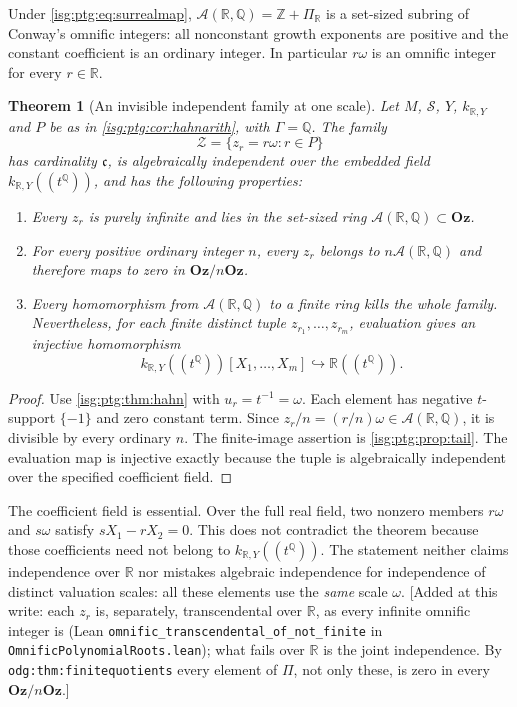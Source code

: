 \documentclass[11pt]{article}
\newtheorem{theorem}{Theorem}[section]
\theoremstyle{definition}
\theoremstyle{remark}
\newcommand{\Oz}{\ensuremath{\mathbf{Oz}}}
\newcommand{\R}{\mathbb{R}}
\newcommand{\Z}{\mathbb{Z}}
\newcommand{\Q}{\mathbb{Q}}
\newcommand{\Asc}{\mathcal{A}}
\newcommand{\cfrak}{\mathfrak{c}}
\newcommand{\replabel}[1]{\nolinkurl{#1}}
\newcommand{\fn}[1]{\nolinkurl{#1}}
\begin{document}
Under \eqref{isg:ptg:eq:surrealmap}, $\Asc(\R,\Q)=\Z+\Pi_\R$ is a set-sized
subring of Conway's omnific integers: all nonconstant growth exponents are
positive and the constant coefficient is an ordinary integer. In particular
$r\omega$ is an omnific integer for every $r\in\R$.

\begin{theorem}[An invisible independent family at one scale]\label{isg:ptg:thm:omnific}
Let $M$, $\mathcal S$, $Y$, $k_{\R,Y}$ and $P$ be as in
\cref{isg:ptg:cor:hahnarith}, with $\Gamma=\Q$. The family
\[
 \mathcal Z=\{z_r=r\omega:r\in P\}
\]
has cardinality $\cfrak$, is algebraically independent over the embedded
field $k_{\R,Y}((t^\Q))$, and has the following properties:
\begin{enumerate}[label=\textup{(\arabic*)}]
\item Every $z_r$ is purely infinite and lies in the set-sized ring
$\Asc(\R,\Q)\subset\Oz$.
\item For every positive ordinary integer $n$, every $z_r$ belongs to
$n\Asc(\R,\Q)$ and therefore maps to zero in $\Oz/n\Oz$.
\item Every homomorphism from $\Asc(\R,\Q)$ to a finite ring kills the
whole family. Nevertheless, for each finite distinct tuple
$z_{r_1},\ldots,z_{r_m}$, evaluation gives an injective homomorphism
\[
 k_{\R,Y}((t^\Q))[X_1,\ldots,X_m]\hookrightarrow\R((t^\Q)).
\]
\end{enumerate}
\end{theorem}
\begin{proof}
Use \cref{isg:ptg:thm:hahn} with $u_r=t^{-1}=\omega$. Each element has
negative $t$-support $\{-1\}$ and zero constant term. Since
$z_r/n=(r/n)\omega\in\Asc(\R,\Q)$, it is divisible by every ordinary $n$.
The finite-image assertion is \cref{isg:ptg:prop:tail}. The evaluation map
is injective exactly because the tuple is algebraically independent over
the specified coefficient field.
\end{proof}

The coefficient field is essential. Over the full real field, two nonzero
members $r\omega$ and $s\omega$ satisfy $sX_1-rX_2=0$. This does not
contradict the theorem because those coefficients need not belong to
$k_{\R,Y}((t^\Q))$. The statement neither claims independence over $\R$
nor mistakes algebraic independence for independence of distinct valuation
scales: all these elements use the \emph{same} scale $\omega$.
\textup{[}Added at this write: each $z_r$ is, separately, transcendental
over $\R$, as every infinite omnific integer is (Lean
\fn{omnific_transcendental_of_not_finite} in
\fn{OmnificPolynomialRoots.lean}); what fails over $\R$ is the joint
independence. By \replabel{odg:thm:finitequotients} every element of
$\Pi$, not only these, is zero in every $\Oz/n\Oz$.\textup{]}
\end{document}
